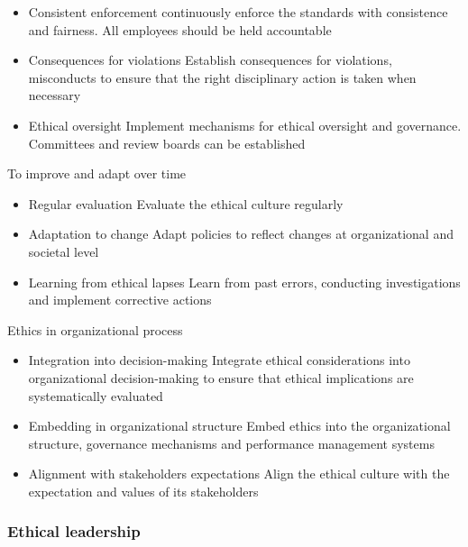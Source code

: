 \begin{itemize}
    \item Consistent enforcement \ra continuously enforce the standards with consistence and fairness. All employees should be held accountable
    \item Consequences for violations \ra Establish consequences for violations, misconducts to ensure that the right disciplinary action is taken when necessary
    \item Ethical oversight \ra Implement mechanisms for ethical oversight and governance. Committees and review boards can be established
\end{itemize}

To improve and adapt over time
\begin{itemize}
    \item Regular evaluation \ra Evaluate the ethical culture regularly
    \item Adaptation to change \ra Adapt policies to reflect changes at organizational and societal level
    \item Learning from ethical lapses \ra Learn from past errors, conducting investigations and implement corrective actions
\end{itemize}

Ethics in organizational process
\begin{itemize}
    \item Integration into decision-making \ra Integrate ethical considerations into organizational decision-making to ensure that ethical implications are systematically evaluated
    \item Embedding in organizational structure \ra Embed ethics into the organizational structure, governance mechanisms and performance management systems
    \item Alignment with stakeholders expectations \ra Align the ethical culture with the expectation and values of its stakeholders
\end{itemize}




















\subsubsection{Ethical leadership}

